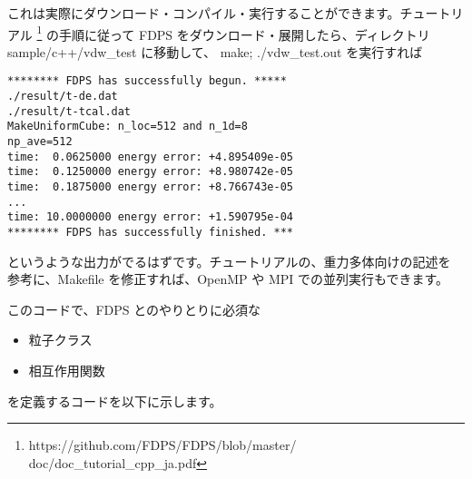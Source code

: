 \documentclass[twocolumn,10pt]{jarticle}
\begin{document}
これは実際にダウンロード・コンパイル・実行することができます。チュートリアル
\footnote{https://github.com/FDPS/FDPS/blob/master/
  doc/doc\_tutorial\_cpp\_ja.pdf}
の手順に従って FDPS をダウンロード・展開したら、ディレクトリ
sample/c++/vdw\_test に移動して、 make; ./vdw\_test.out を実行すれば

{\scriptsize
\begin{verbatim}
******** FDPS has successfully begun. *****
./result/t-de.dat
./result/t-tcal.dat
MakeUniformCube: n_loc=512 and n_1d=8
np_ave=512
time:  0.0625000 energy error: +4.895409e-05
time:  0.1250000 energy error: +8.980742e-05
time:  0.1875000 energy error: +8.766743e-05
...
time: 10.0000000 energy error: +1.590795e-04
******** FDPS has successfully finished. ***
\end{verbatim}
}
というような出力がでるはずです。チュートリアルの、重力多体向けの記述を
参考に、Makefile を修正すれば、OpenMP や MPI での並列実行もできます。

このコードで、FDPS とのやりとりに必須な
\begin{itemize}
\item 粒子クラス
\item 相互作用関数
\end{itemize}  
を定義するコードを以下に示します。
\end{document}
